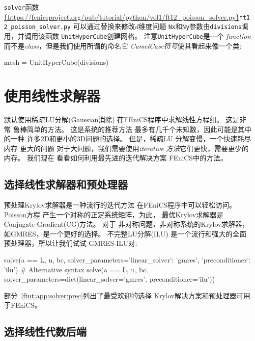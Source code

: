\texttt{solver}函数
\url{{https://fenicsproject.org/pub/tutorial/python/vol1/ft12_poisson_solver.py}}{\nolinkurl{ft12_poisson_solver.py}}
可以通过替换来修改$d$维度问题
\texttt{Nx}和\texttt{Ny}参数由\texttt{divisions}调用，并调用该函数
\texttt{UnitHyperCube}创建网格。 注意\texttt{UnitHyperCube}是一个
\emph{function}而不是\emph{class}，但是我们使用所谓的命名它
\emph{CamelCase符号}使其看起来像一个类:

\begin{python}
mesh = UnitHyperCube(divisions)
\end{python}

\section{使用线性求解器}
\label{ch:poisson0:solve:prm}

默认使用稀疏LU分解(Gaussian消除)
在FEniCS程序中求解线性方程组。 这是非常
鲁棒简单的方法。 这是系统的推荐方法
最多有几千个未知数，因此可能是其中的一种
许多2D和更小的3D问题的选择。 但是，稀疏LU
分解变慢，一个快速耗尽内存
更大的问题 对于大问题，我们需要使用\emph{iterative
方法}它们更快，需要更少的内存。 我们现在
看看如何利用最先进的迭代解决方案
FEniCS中的方法。

\subsection{选择线性求解器和预处理器}


预处理Krylov求解器是一种流行的迭代方法
在FEniCS程序中可以轻松访问。 Poisson方程
产生一个对称的正定系统矩阵，为此，
最优Krylov求解器是Conjugate Gradient(CG)方法。 对于
非对称问题，非对称系统的Krylov求解器，
如GMRES，是一个更好的选择。 不完整LU分解(ILU)
是一个流行和强大的全面预处理器，所以让我们试试
GMRES-ILU对:

\begin{python}
solve(a == L, u, bc,
      solver_parameters={'linear_solver': 'gmres',
                         'preconditioner': 'ilu'})
# Alternative syntax
solve(a == L, u, bc,
      solver_parameters=dict(linear_solver='gmres',
                             preconditioner='ilu'))
\end{python}
部分~\ref{ftut:app:solver:prec}列出了最受欢迎的选择
Krylov解决方案和预处理器可用于FEniCS。

 

\subsection{选择线性代数后端}

